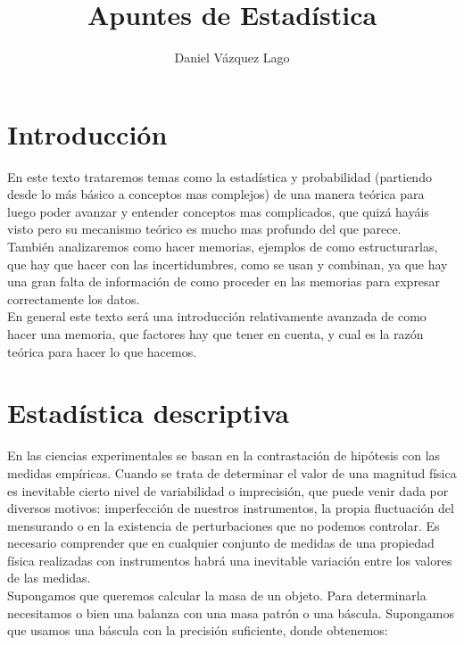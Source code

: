 \documentclass[12pt,a4paper]{book}
\author{Daniel Vázquez Lago}
\title{Apuntes de Estadística}
\begin{document}
\maketitle

\newpage

\tableofcontents

\newpage

\chapter*{Introducción}

En este texto trataremos temas como la estadística y probabilidad (partiendo desde lo más básico a conceptos mas complejos) de una manera teórica para luego poder avanzar y entender conceptos mas complicados, que quizá hayáis visto pero su mecanismo teórico es mucho mas profundo del que parece. \\

También analizaremos como hacer memorias, ejemplos de como estructurarlas, que hay que hacer con las incertidumbres, como se usan y combinan, ya que hay una gran falta de información de como proceder en las memorias para expresar correctamente los datos. \\

En general este texto será una introducción relativamente avanzada de como hacer una memoria, que factores hay que tener en cuenta, y cual es la razón teórica para hacer lo que hacemos. 



\chapter{Estadística descriptiva \label{Sec:estadistica}}


En las ciencias experimentales se basan en la contrastación de hipótesis con las medidas empíricas. Cuando se trata de determinar  el valor de una magnitud física es inevitable cierto nivel de variabilidad o imprecisión, que puede venir dada por diversos motivos: imperfección de nuestros instrumentos, la propia fluctuación del mensurando o en la existencia de perturbaciones que no podemos controlar. Es necesario comprender que en cualquier conjunto de medidas de una propiedad física realizadas con instrumentos habrá una inevitable variación entre los valores de las medidas. \\

Supongamos que queremos calcular la masa de un objeto. Para determinarla necesitamos o bien una balanza con una masa patrón o una báscula. Supongamos que usamos una báscula con la precisión suficiente, donde obtenemos: 
\end{document}

